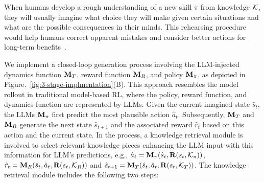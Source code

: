 When humans develop a rough understanding of a new skill $\pi$ from knowledge $\mathcal{K}$, they will usually imagine what choice they will make given certain situations and what are the possible consequences in their minds. This rehearsing procedure would help humans correct apparent mistakes and consider better actions for long-term benefits~\citep{rehearsing@2024jia}. 


 


We implement a closed-loop generation process involving the LLM-injected dynamics function $\mathbf{M}_{T}$, reward function $\mathbf{M}_{R}$, and policy $\mathbf{M}_{\pi}$, as depicted in Figure.~\ref{fig:3-stage-implmentation}(B). 
This approach resembles the model rollout in traditional model-based RL, where the policy, reward function, and dynamics function are represented by LLMs. Given the current imagined state $\hat s_t$, the LLMs $\mathbf{M}_{\pi}$ first predict the most plausible action $\hat a_t$. Subsequently, $\mathbf{M}_{T}$ and $\mathbf{M}_{R}$ generate the next state $\hat s_{t+1}$ and the associated reward $\hat r_{t}$ based on this action and the current state. In the process, a knowledge retrieval module is involved to select relevant knowledge pieces enhancing the LLM input with this information for LLM's predictions, e.g., $\hat a_{t}=\mathbf{M}_{\pi}(\hat s_t, \mathbf{R}(s_t, \mathcal{K}_{\pi}))$, $\hat r_t = \mathbf{M}_{R}(\hat s_t, \hat a_t, \mathbf{R}(s_t, \mathcal{K}_{R}))$ and $\hat s_{t+1} = \mathbf{M}_{T}(\hat s_t, \hat a_t, \mathbf{R}(s_t, \mathcal{K}_{T}))$. The knowledge retrieval module includes the following two steps:

